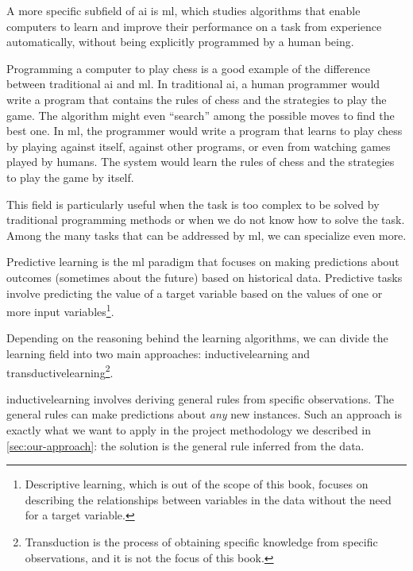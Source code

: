 A more specific subfield of \gls{ai} is \gls{ml}, which studies algorithms that
enable computers to learn and improve their performance on a task from
experience automatically, without being explicitly programmed by a human being.

Programming a computer to play chess is a good example of the difference between
traditional \gls{ai} and \gls{ml}.  In traditional \gls{ai}, a human programmer
would write a program that contains the rules of chess and the strategies to play the game.
The algorithm might even ``search'' among the possible moves to find the best one.  In
\gls{ml}, the programmer would write a program that learns to play chess by playing
against itself, against other programs, or even from watching games played by humans.
The system would learn the rules of chess and the strategies to play the game by itself.

This field is particularly useful when the task is too complex to be solved by
traditional programming methods or when we do not know how to solve the task.
Among the many tasks that can be addressed by \gls{ml}, we can specialize even more.

Predictive learning is the \gls{ml} paradigm that focuses on making predictions about
outcomes (sometimes about the future) based on historical data.  Predictive tasks
involve predicting the value of a target variable based on the values of one or more
input variables\footnote{Descriptive learning, which is out of the scope of this book,
focuses on describing the relationships between variables in the data without the
need for a target variable.}.

Depending on the reasoning behind the learning algorithms, we can divide the learning
field into two main approaches: \gls{inductivelearning} and \gls{transductivelearning}\footnote{Transduction is the process of obtaining specific knowledge from specific
observations, and it is not the focus of this book.}.

\Gls{inductivelearning} involves deriving general rules from specific observations.  The
general rules can make predictions about \emph{any} new instances.  Such an approach
is exactly what we want to apply in the project methodology we described in
\cref{sec:our-approach}:  the solution is the general rule inferred from the data.

